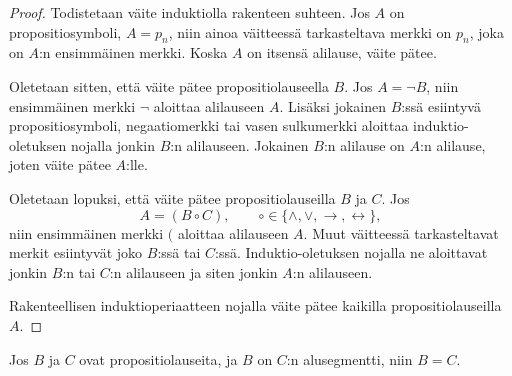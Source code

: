 \documentclass[12pt,a4paper]{article}
\begin{document}
\begin{proof}
Todistetaan väite induktiolla rakenteen suhteen. Jos \(A\) on propositiosymboli,
\(A = p_n\), niin ainoa väitteessä tarkasteltava merkki on \(p_n\), joka
on \(A\):n ensimmäinen merkki. Koska \(A\) on itsensä alilause, väite pätee.

Oletetaan sitten, että väite pätee propositiolauseella \(B\).
Jos \(A = \neg B\), niin ensimmäinen merkki \(\neg\) aloittaa alilauseen \(A\).
Lisäksi jokainen \(B\):ssä esiintyvä propositiosymboli, negaatiomerkki tai
vasen sulkumerkki aloittaa induktio-oletuksen nojalla jonkin \(B\):n alilauseen.
Jokainen \(B\):n alilause on \(A\):n alilause, joten väite pätee \(A\):lle.

Oletetaan lopuksi, että väite pätee propositiolauseilla \(B\) ja \(C\).
Jos
\[
A = (B \circ C), \qquad
\circ \in \{\land, \lor, \rightarrow, \leftrightarrow\},
\]
niin ensimmäinen merkki \((\) aloittaa alilauseen \(A\). Muut väitteessä
tarkasteltavat merkit esiintyvät joko \(B\):ssä tai \(C\):ssä.
Induktio-oletuksen nojalla ne aloittavat jonkin \(B\):n tai \(C\):n alilauseen
ja siten jonkin \(A\):n alilauseen.

Rakenteellisen induktioperiaatteen nojalla väite pätee kaikilla
propositiolauseilla \(A\).
\end{proof}

\begin{lemma}\label{lem:start-seg}
Jos \(B\) ja \(C\) ovat propositiolauseita, ja \(B\) on \(C\):n alusegmentti,
niin \(B = C\).
\end{lemma}
\end{document}
